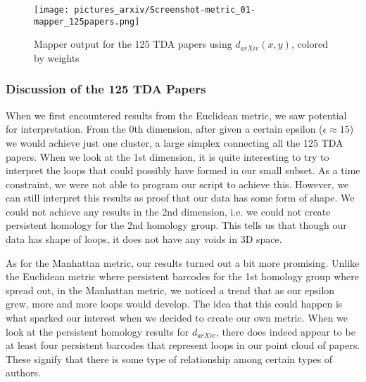 \documentclass[12pt]{article}
\theoremstyle{definition}
\begin{document}
\begin{figure}[h]
\texttt{[image: pictures\_arxiv/Screenshot-metric\_01-mapper\_125papers.png]}
\caption{Mapper output for the 125 TDA papers using $d_{arXiv}(x,y)$, colored by weights}
\label{pic-125papers-metric_01-mapper}
\end{figure}

\pagebreak

\subsubsection{Discussion of the 125 TDA Papers}

When we first encountered results from the Euclidean metric, we saw potential for interpretation. From the 0th dimension, after given a certain epsilon ($\epsilon\approx 15$) we would achieve just one cluster, a large simplex connecting all the 125 TDA papers. When we look at the 1st dimension, it is quite interesting to try to interpret the loops that could possibly have formed in our small subset. As a time constraint, we were not able to program our script to achieve this. However, we can still interpret this results as proof that our data has some form of shape. We could not achieve any results in the 2nd dimension, i.e. we could not create persistent homology for the 2nd homology group. This tells us that though our data has shape of loops, it does not have any voids in 3D space. 
\newline
\par As for the Manhattan metric, our results turned out a bit more promising. Unlike the Euclidean metric where persistent barcodes for the 1st homology group where spread out, in the Manhattan metric, we noticed a trend that as our epsilon grew, more and more loops would develop. The idea that this could happen is what sparked our interest when we decided to create our own metric. When we look at the persistent homology results for $d_{arXiv}$, there does indeed appear to be at least four persistent barcodes that represent loops in our point cloud of papers. These signify that there is some type of relationship among certain types of authors. 
\newline
\end{document}
